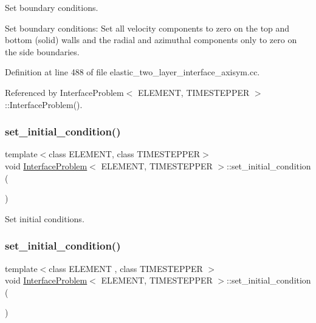 Set boundary conditions. 

Set boundary conditions\+: Set all velocity components to zero on the top and bottom (solid) walls and the radial and azimuthal components only to zero on the side boundaries. 

Definition at line 488 of file elastic\+\_\+two\+\_\+layer\+\_\+interface\+\_\+axisym.\+cc.



Referenced by Interface\+Problem$<$ E\+L\+E\+M\+E\+N\+T, T\+I\+M\+E\+S\+T\+E\+P\+P\+E\+R $>$\+::\+Interface\+Problem().

\mbox{\label{classInterfaceProblem_a0d3af8378c4f0a6e38636be958c300d5}} 
\subsubsection{\texorpdfstring{set\+\_\+initial\+\_\+condition()}{set\_initial\_condition()}\hspace{0.1cm}{\footnotesize\ttfamily [1/2]}}
{\footnotesize\ttfamily template$<$class E\+L\+E\+M\+E\+NT, class T\+I\+M\+E\+S\+T\+E\+P\+P\+ER$>$ \\
void \hyperlink{classInterfaceProblem}{Interface\+Problem}$<$ E\+L\+E\+M\+E\+NT, T\+I\+M\+E\+S\+T\+E\+P\+P\+ER $>$\+::set\+\_\+initial\+\_\+condition (\begin{DoxyParamCaption}{ }\end{DoxyParamCaption})}



Set initial conditions. 

\mbox{\label{classInterfaceProblem_a0d3af8378c4f0a6e38636be958c300d5}} 
\subsubsection{\texorpdfstring{set\+\_\+initial\+\_\+condition()}{set\_initial\_condition()}\hspace{0.1cm}{\footnotesize\ttfamily [2/2]}}
{\footnotesize\ttfamily template$<$class E\+L\+E\+M\+E\+NT , class T\+I\+M\+E\+S\+T\+E\+P\+P\+ER $>$ \\
void \hyperlink{classInterfaceProblem}{Interface\+Problem}$<$ E\+L\+E\+M\+E\+NT, T\+I\+M\+E\+S\+T\+E\+P\+P\+ER $>$\+::set\+\_\+initial\+\_\+condition (\begin{DoxyParamCaption}{ }\end{DoxyParamCaption})}



